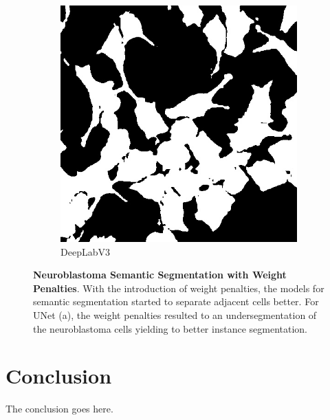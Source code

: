 \documentclass[journal]{IEEEtran}
\begin{document}
\begin{figure}
\begin{subfigure}[b]{0.45\linewidth}
\includegraphics[width=\linewidth]{weighted/110115-deeplab.jpg}
\caption{DeepLabV3}
\end{subfigure}
\caption{\textbf{Neuroblastoma Semantic Segmentation with Weight Penalties}. With the introduction of weight penalties, the models for semantic segmentation started to separate adjacent cells better. For UNet (a), the weight penalties resulted to an undersegmentation of the neuroblastoma cells yielding to better instance segmentation.}
\label{fig:segmentation_with_weight_map}
\end{figure}
%
\section{Conclusion}
The conclusion goes here.
\end{document}
